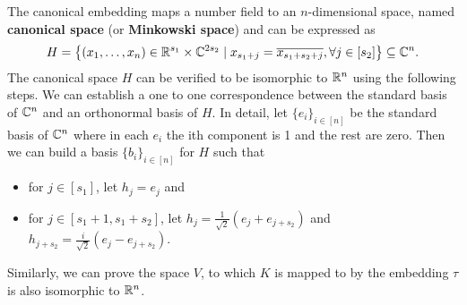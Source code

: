 \documentclass[../main.tex]{subfiles}
\begin{document}
The canonical embedding maps a number field to an $n$-dimensional space, 
\reversemarginpar
{}
named \textbf{canonical space} (or \textbf{Minkowski space}) and can be expressed as  
\begin{equation*}
H = \left\{(x_1, \dots, x_n) \in \mathbb{R}^{s_1} \times \mathbb{C}^{2s_2} \mid x_{s_1 + j} = \overline{x_{s_1 + s_2 + j}}, \forall j \in [s_2]\right\} \subseteq \mathbb{C}^n.   
\end{equation*}
The canonical space $H$ can be verified to be isomorphic to $\mathbb{R}^n$ using the following steps. We can establish a one to one correspondence between the standard basis of $\mathbb{C}^n$ and an orthonormal basis of $H$. In detail, let $\{e_i\}_{i \in [n]}$ be the standard basis of $\mathbb{C}^n$ where in each $e_i$ the ith component is 1 and the rest are zero. Then we can build a basis $\{b_i\}_{i \in [n]}$ for $H$ such that 
\begin{itemize}
    \item for $j \in [s_1]$, let $h_j = e_j$  and 
    \item for $j \in [s_1+1, s_1 + s_2]$, let $h_j = \frac{1}{\sqrt{2}} (e_j + e_{j + s_2})$ and $h_{j+s_2} = \frac{i}{\sqrt{2}}(e_j - e_{j + s_2})$.
\end{itemize}
Similarly, we can prove the space $V$, to which $K$ is mapped to by the embedding $\tau$ is also isomorphic to $\mathbb{R}^n$. %
\end{document}

